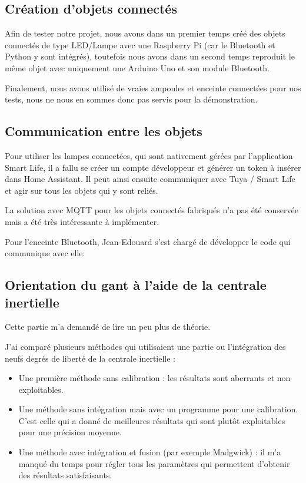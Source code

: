 \documentclass[10pt]{article}
\begin{document}
        \subsection{Création d'objets connectés}

            Afin de tester notre projet, nous avons dans un premier temps créé des objets connectés de type LED/Lampe
                avec une Raspberry Pi (car le Bluetooth et Python y sont intégrés), toutefois nous avons dans un second temps
                reproduit le même objet avec uniquement une Arduino Uno et son module Bluetooth.
            
            Finalement, nous avons utilisé de vraies ampoules et enceinte connectées pour nos tests, nous ne nous en sommes donc pas servis pour la démonstration.

        \subsection{Communication entre les objets}

            Pour utiliser les lampes connectées, qui sont nativement gérées par l'application Smart Life, il a fallu se créer un compte développeur
                et générer un token à insérer dans Home Assistant. Il peut ainsi ensuite communiquer avec Tuya / Smart Life et agir sur tous les objets qui y sont reliés.

            La solution avec MQTT pour les objets connectés fabriqués n'a pas été conservée mais a été très intéressante à implémenter.

            Pour l'enceinte Bluetooth, Jean-Edouard s'est chargé de développer le code qui communique avec elle.

        \subsection{Orientation du gant à l'aide de la centrale inertielle}

            Cette partie m'a demandé de lire un peu plus de théorie.

            J'ai comparé plusieurs méthodes qui utilisaient une partie ou l'intégration des neufs degrés de liberté de la centrale inertielle :
            \begin{itemize}
                \item Une première méthode sans calibration : les résultats sont aberrants et non exploitables.
                \item Une méthode sans intégration mais avec un programme pour une calibration. C'est celle qui a donné de meilleures résultats 
                        qui sont plutôt exploitables pour une précision moyenne.
                \item Une méthode avec intégration et fusion (par exemple Madgwick) : il m'a manqué du temps pour régler tous les paramètres qui permettent d'obtenir des résultats satisfaisants.
            \end{itemize}
            
\end{document}
